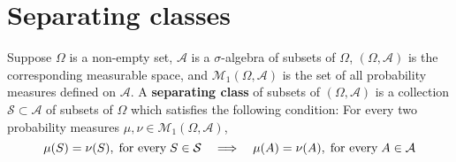 

\section{Separating classes}
\setcounter{theorem}{0}
\setcounter{equation}{0}

\renewcommand{\theenumi}{\roman{enumi}}
\renewcommand{\labelenumi}{\textnormal{(\theenumi)}$\;\;$}

\begin{definition}
\mbox{}\vskip 0.1cm
\noindent
Suppose $\Omega$ is a non-empty set, $\mathcal{A}$ is a $\sigma$-algebra of subsets of $\Omega$,
$(\Omega,\mathcal{A})$ is the corresponding measurable space, and
$\mathcal{M}_{1}\!\left(\Omega,\mathcal{A}\right)$ is the set of all probability measures defined
on $\mathcal{A}$.
A \textbf{separating class} of subsets of $\left(\Omega,\mathcal{A}\right)$ is
a collection $\mathcal{S} \subset \mathcal{A}$ of subsets of $\Omega$
which satisfies the following condition:
For every two probability measures $\mu, \nu \in \mathcal{M}_{1}\!\left(\Omega,\mathcal{A}\right)$,
\begin{equation*}
\mu(S) = \nu(S), \;\textnormal{for every}\; S \in \mathcal{S}
\quad\Longrightarrow\quad
\mu(A) = \nu(A), \;\textnormal{for every}\; A \in \mathcal{A}		
\end{equation*}
\end{definition}


